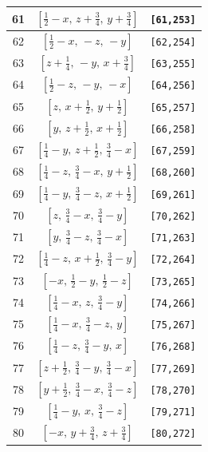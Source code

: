 \documentclass[fleqn,8pt]{jsarticle}
\begin{document}
\begin{longtable}{ccc}
61 & $\left[ \frac{1}{2} - x,\, z + \frac{3}{4},\, y + \frac{3}{4} \right]$ & {\tt [61,253]} \\ \hline
62 & $\left[ \frac{1}{2} - x,\, - z,\, - y \right]$ & {\tt [62,254]} \\ \hline
63 & $\left[ z + \frac{1}{4},\, - y,\, x + \frac{3}{4} \right]$ & {\tt [63,255]} \\ \hline
64 & $\left[ \frac{1}{2} - z,\, - y,\, - x \right]$ & {\tt [64,256]} \\ \hline
65 & $\left[ z,\, x + \frac{1}{2},\, y + \frac{1}{2} \right]$ & {\tt [65,257]} \\ \hline
66 & $\left[ y,\, z + \frac{1}{2},\, x + \frac{1}{2} \right]$ & {\tt [66,258]} \\ \hline
67 & $\left[ \frac{1}{4} - y,\, z + \frac{1}{2},\, \frac{3}{4} - x \right]$ & {\tt [67,259]} \\ \hline
68 & $\left[ \frac{1}{4} - z,\, \frac{3}{4} - x,\, y + \frac{1}{2} \right]$ & {\tt [68,260]} \\ \hline
69 & $\left[ \frac{1}{4} - y,\, \frac{3}{4} - z,\, x + \frac{1}{2} \right]$ & {\tt [69,261]} \\ \hline
70 & $\left[ z,\, \frac{3}{4} - x,\, \frac{3}{4} - y \right]$ & {\tt [70,262]} \\ \hline
71 & $\left[ y,\, \frac{3}{4} - z,\, \frac{3}{4} - x \right]$ & {\tt [71,263]} \\ \hline
72 & $\left[ \frac{1}{4} - z,\, x + \frac{1}{2},\, \frac{3}{4} - y \right]$ & {\tt [72,264]} \\ \hline
73 & $\left[ - x,\, \frac{1}{2} - y,\, \frac{1}{2} - z \right]$ & {\tt [73,265]} \\ \hline
74 & $\left[ \frac{1}{4} - x,\, z,\, \frac{3}{4} - y \right]$ & {\tt [74,266]} \\ \hline
75 & $\left[ \frac{1}{4} - x,\, \frac{3}{4} - z,\, y \right]$ & {\tt [75,267]} \\ \hline
76 & $\left[ \frac{1}{4} - z,\, \frac{3}{4} - y,\, x \right]$ & {\tt [76,268]} \\ \hline
77 & $\left[ z + \frac{1}{2},\, \frac{3}{4} - y,\, \frac{3}{4} - x \right]$ & {\tt [77,269]} \\ \hline
78 & $\left[ y + \frac{1}{2},\, \frac{3}{4} - x,\, \frac{3}{4} - z \right]$ & {\tt [78,270]} \\ \hline
79 & $\left[ \frac{1}{4} - y,\, x,\, \frac{3}{4} - z \right]$ & {\tt [79,271]} \\ \hline
80 & $\left[ - x,\, y + \frac{3}{4},\, z + \frac{3}{4} \right]$ & {\tt [80,272]} \\ \hline

\end{longtable}
\end{document}
